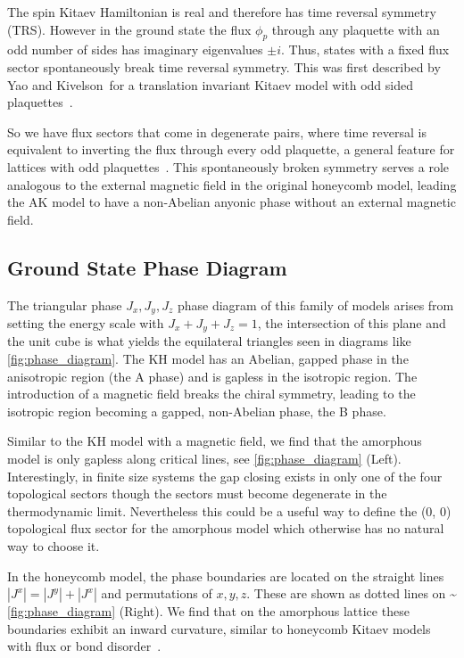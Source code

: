 The spin Kitaev Hamiltonian is real and therefore has time reversal symmetry (TRS). However in the ground state the flux \(\phi_p\) through any plaquette with an odd number of sides has imaginary eigenvalues \(\pm i\). Thus, states with a fixed flux sector spontaneously break time reversal symmetry. This was first described by Yao and Kivelson~for a translation invariant Kitaev model with odd sided plaquettes~\autocite{Yao2011}.

So we have flux sectors that come in degenerate pairs, where time reversal is equivalent to inverting the flux through every odd plaquette, a general feature for lattices with odd plaquettes~\autocite{yaoExactChiralSpin2007,Peri2020}. This spontaneously broken symmetry serves a role analogous to the external magnetic field in the original honeycomb model, leading the AK model to have a non-Abelian anyonic phase without an external magnetic field.

\hypertarget{ground-state-phase-diagram}{%
\subsection{Ground State Phase Diagram}\label{ground-state-phase-diagram}}

The triangular phase \(J_x, J_y, J_z\) phase diagram of this family of models arises from setting the energy scale with \(J_x + J_y + J_z = 1\), the intersection of this plane and the unit cube is what yields the equilateral triangles seen in diagrams like \cref{fig:phase_diagram}. The KH model has an Abelian, gapped phase in the anisotropic region (the A phase) and is gapless in the isotropic region. The introduction of a magnetic field breaks the chiral symmetry, leading to the isotropic region becoming a gapped, non-Abelian phase, the B phase.

Similar to the KH model with a magnetic field, we find that the amorphous model is only gapless along critical lines, see \cref{fig:phase_diagram} (Left). Interestingly, in finite size systems the gap closing exists in only one of the four topological sectors though the sectors must become degenerate in the thermodynamic limit. Nevertheless this could be a useful way to define the (0, 0) topological flux sector for the amorphous model which otherwise has no natural way to choose it.

In the honeycomb model, the phase boundaries are located on the straight lines \(|J^x| = |J^y| + |J^x|\) and permutations of \(x,y,z\). These are shown as dotted lines on \textasciitilde{}\cref{fig:phase_diagram} (Right). We find that on the amorphous lattice these boundaries exhibit an inward curvature, similar to honeycomb Kitaev models with flux or bond disorder~\autocite{knolle_dynamics_2016,Nasu_Thermal_2015,lahtinenPerturbedVortexLattices2014,willansDisorderQuantumSpin2010,zschockePhysicalStatesFinitesize2015,kaoDisorderDisorderLocalization2021}.

